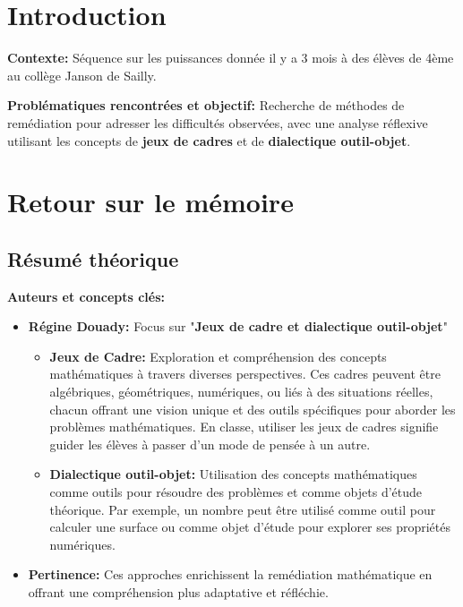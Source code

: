 \def\theme{présentation mémoire}
\def\date{14/05/2024}


\section*{Introduction}
\textbf{Contexte:} Séquence sur les puissances donnée il y a 3 mois à des élèves de 4ème au collège Janson de Sailly.

\textbf{Problématiques rencontrées et objectif:} Recherche de méthodes de remédiation pour adresser les difficultés observées, avec une analyse réflexive utilisant les concepts de \textbf{jeux de cadres} et de \textbf{dialectique outil-objet}.

\section{Retour sur le mémoire}
\subsection{Résumé théorique}
\textbf{Auteurs et concepts clés:}
\begin{itemize}
    \item \textbf{Régine Douady:} Focus sur "\textbf{Jeux de cadre et dialectique outil-objet}"
    \begin{itemize}
        \item \textbf{Jeux de Cadre:} Exploration et compréhension des concepts mathématiques à travers diverses perspectives.
        Ces cadres peuvent être algébriques,
        géométriques,
        numériques,
        ou liés à des situations réelles,
        chacun offrant une vision unique et des outils spécifiques pour aborder les problèmes mathématiques.
        En classe, utiliser les jeux de cadres signifie guider les élèves à passer d'un mode de pensée à un autre.
        \item \textbf{Dialectique outil-objet:} Utilisation des concepts mathématiques comme outils pour résoudre des problèmes et comme objets d'étude théorique.
        Par exemple, un nombre peut être utilisé comme outil pour calculer une surface ou comme objet d'étude pour explorer ses propriétés numériques.
    \end{itemize}
    \item \textbf{Pertinence:} Ces approches enrichissent la remédiation mathématique en offrant une compréhension plus adaptative et réfléchie.
\end{itemize}

